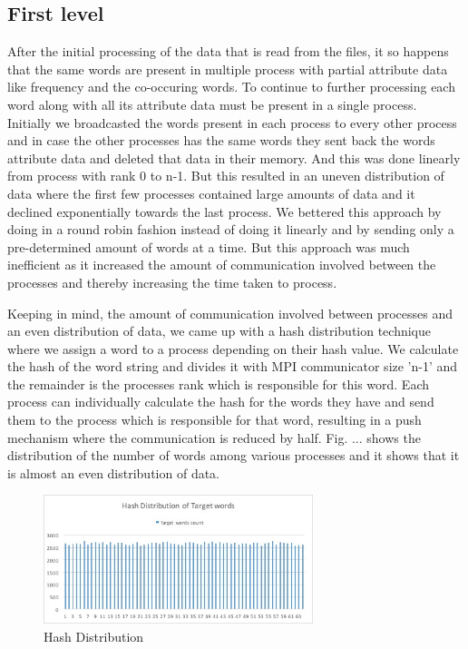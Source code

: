 \documentclass[article,dr=phil,type=drfinal,colorback,accentcolor=tud9c]{tudthesis}
\begin{document}
\subsection{First level}
After the initial processing of the data that is read from the files, it so happens that the same words are present in multiple process with partial attribute data like frequency and the co-occuring words. To continue to further processing each word along with all its attribute data must be present in a single process. Initially we broadcasted the words present in each process to every other process and in case the other processes has the same words they sent back the words attribute data and deleted that data in their memory. And this was done linearly from process with rank 0 to n-1. But this resulted in an uneven distribution of data where the first few processes contained large amounts of data and it declined exponentially towards the last process. We bettered this approach by doing in a round robin fashion instead of doing it linearly and by sending only a pre-determined amount of words at a time. But this approach was much inefficient as it increased the amount of communication involved between the processes and thereby increasing the time taken to process.

Keeping in mind, the amount of communication involved between processes and an even distribution of data, we came up with a hash distribution technique where we assign a word to a process depending on their hash value. We calculate the hash of the word string and divides it with MPI communicator size 'n-1' and the remainder is the processes rank which is responsible for this word. Each process can individually calculate the hash for the words they have and send them to the process which is responsible for that word, resulting in a push mechanism where the communication is reduced by half. Fig. ... shows the distribution of the number of words among various processes and it shows that it is almost an even distribution of data.


\begin{figure}[htb]
	\centering
	\includegraphics[width=0.7\textwidth]{images/hashdistribution}
	\caption[Hash Distribution]{Hash Distribution}
	\label{fig:hashdistribution}
\end{figure}
\end{document}

